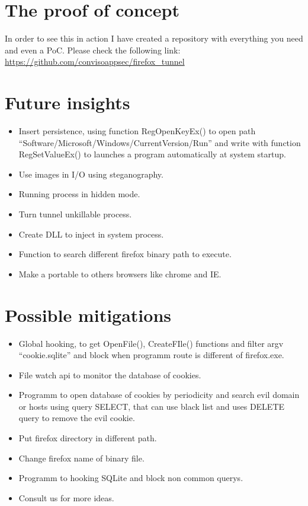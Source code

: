 \documentclass[tog]{acmsiggraph}
\begin{document}
\section{The proof of concept}

In order to see this in action I have created a repository with everything you need and even a PoC. Please check the following link:
{\small\url{https://github.com/convisoappsec/firefox_tunnel}}

\section{Future insights}

\begin{itemize}
\item Insert persistence, using function RegOpenKeyEx() to  open path “Software/Microsoft/Windows/CurrentVersion/Run” and write with function RegSetValueEx() to launches a program automatically at system startup.
\item Use images in I/O using steganography.
\item Running process in  hidden mode.
\item Turn tunnel unkillable process.
\item Create DLL to inject in system process.
\item Function  to search different firefox binary path to execute.
\item Make a portable to others browsers like chrome and IE.
\end{itemize}

\section{Possible mitigations}

\begin{itemize}
\item Global hooking, to get  OpenFile(), CreateFIle() functions and filter argv “cookie.sqlite” and block  when programm route is different of firefox.exe.
\item File watch api to monitor the database of cookies.
\item Programm to open database of cookies by periodicity and search evil domain or  hosts using query SELECT, that can use black list and uses DELETE query to remove the evil cookie.
\item Put firefox directory in different path.
\item Change firefox name of  binary file.
\item Programm to hooking SQLite and block non common querys.
\item Consult us for more ideas.
\end{itemize}
\end{document}
